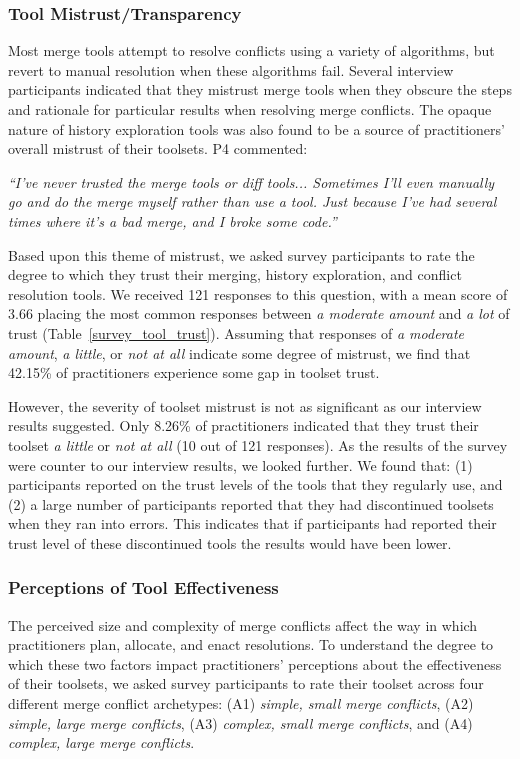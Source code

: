 \subsubsection{Tool Mistrust/Transparency}\label{tool_trust}
Most merge tools attempt to resolve conflicts using a variety of algorithms, but revert to manual resolution when these algorithms fail.
Several interview participants indicated that they mistrust merge tools when they obscure the steps and rationale for particular results when resolving merge conflicts.
The opaque nature of history exploration tools was also found to be a source of practitioners' overall mistrust of their toolsets.
P4 commented:
\begin{quoting}
\textit{``I've never trusted the merge tools or diff tools... Sometimes I'll even manually go and do the merge myself rather than use a tool. Just because I've had several times where it's a bad merge, and I broke some code.''}
\end{quoting}

Based upon this theme of mistrust, we asked survey participants to rate the degree to which they trust their merging, history exploration, and conflict resolution tools.
We received 121 responses to this question, with a mean score of 3.66 placing the most common responses between \textit{a moderate amount} and \textit{a lot} of trust (Table~\ref{survey_tool_trust}).
Assuming that responses of \textit{a moderate amount}, \textit{a little}, or \textit{not at all} indicate some degree of mistrust, we find that 42.15\% of practitioners experience some gap in toolset trust.

However, the severity of toolset mistrust is not as significant as our interview results suggested.
Only 8.26\% of practitioners indicated that they trust their toolset \textit{a little} or \textit{not at all} (10 out of 121 responses).
As the results of the survey were counter to our interview results, we looked further. We found that: (1) participants reported on the trust levels of the tools that they regularly use, and (2) a large number of participants reported that they had discontinued toolsets when they ran into errors. This indicates that if participants had reported their trust level of these discontinued tools the results would have been lower.

\subsubsection{Perceptions of Tool Effectiveness}\label{tool_effectiveness}
The perceived size and complexity of merge conflicts affect the way in which practitioners plan, allocate, and enact resolutions.
To understand the degree to which these two factors impact practitioners' perceptions about the effectiveness of their toolsets, we asked survey participants to rate their toolset across four different merge conflict archetypes: (A1) \textit{simple, small merge conflicts}, (A2) \textit{simple, large merge conflicts}, (A3) \textit{complex, small merge conflicts}, and (A4) \textit{complex, large merge conflicts}.

